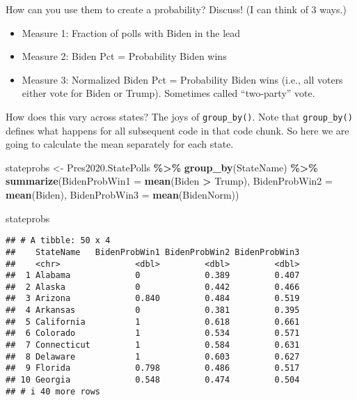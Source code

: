 \documentclass[
]{article}
\newenvironment{Shaded}{\begin{snugshade}}{\end{snugshade}}
\newcommand{\AttributeTok}[1]{\textcolor[rgb]{0.13,0.29,0.53}{#1}}
\newcommand{\FunctionTok}[1]{\textcolor[rgb]{0.13,0.29,0.53}{\textbf{#1}}}
\newcommand{\NormalTok}[1]{#1}
\newcommand{\OtherTok}[1]{\textcolor[rgb]{0.56,0.35,0.01}{#1}}
\newcommand{\SpecialCharTok}[1]{\textcolor[rgb]{0.81,0.36,0.00}{\textbf{#1}}}
\providecommand{\tightlist}{%
  \setlength{\itemsep}{0pt}\setlength{\parskip}{0pt}}
\begin{document}
How can you use them to create a probability? Discuss! (I can think of 3
ways.)

\begin{itemize}
\tightlist
\item
  Measure 1: Fraction of polls with Biden in the lead
\item
  Measure 2: Biden Pct = Probability Biden wins
\item
  Measure 3: Normalized Biden Pct = Probability Biden wins (i.e., all
  voters either vote for Biden or Trump). Sometimes called ``two-party''
  vote.
\end{itemize}

How does this vary across states? The joys of \texttt{group\_by()}. Note
that \texttt{group\_by()} defines what happens for all subsequent code
in that code chunk. So here we are going to calculate the mean
separately for each state.

\begin{Shaded}
\begin{Highlighting}[]
\NormalTok{stateprobs }\OtherTok{\textless{}{-}}\NormalTok{ Pres2020.StatePolls }\SpecialCharTok{\%\textgreater{}\%}
    \FunctionTok{group\_by}\NormalTok{(StateName) }\SpecialCharTok{\%\textgreater{}\%}
      \FunctionTok{summarize}\NormalTok{(}\AttributeTok{BidenProbWin1 =} \FunctionTok{mean}\NormalTok{(Biden }\SpecialCharTok{\textgreater{}}\NormalTok{ Trump),}
                \AttributeTok{BidenProbWin2 =} \FunctionTok{mean}\NormalTok{(Biden),  }
                \AttributeTok{BidenProbWin3 =} \FunctionTok{mean}\NormalTok{(BidenNorm))}

\NormalTok{stateprobs}
\end{Highlighting}
\end{Shaded}

\begin{verbatim}
## # A tibble: 50 x 4
##    StateName   BidenProbWin1 BidenProbWin2 BidenProbWin3
##    <chr>               <dbl>         <dbl>         <dbl>
##  1 Alabama             0             0.389         0.407
##  2 Alaska              0             0.442         0.466
##  3 Arizona             0.840         0.484         0.519
##  4 Arkansas            0             0.381         0.395
##  5 California          1             0.618         0.661
##  6 Colorado            1             0.534         0.571
##  7 Connecticut         1             0.584         0.631
##  8 Delaware            1             0.603         0.627
##  9 Florida             0.798         0.486         0.517
## 10 Georgia             0.548         0.474         0.504
## # i 40 more rows
\end{verbatim}
\end{document}

